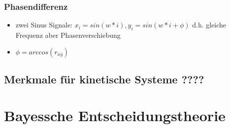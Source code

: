 \documentclass{article} %
\begin{document}
		\subsubsection{Phasendifferenz}
		\begin{itemize}
			\item zwei Sinus Signale: $x_i = sin(w*i), y_i = sin(w*i+\phi)$ d.h. gleiche Frequenz aber Phasenverschiebung
			\item $\phi = arccos(r_{xy})$
		\end{itemize}
	\subsection{Merkmale für kinetische Systeme ????}
\section{Bayessche Entscheidungstheorie}
\end{document}

